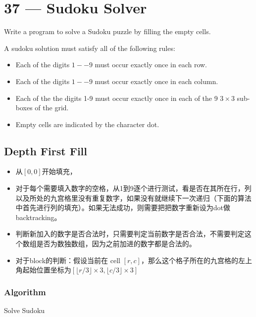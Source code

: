 \section{37 --- Sudoku Solver}
Write a program to solve a Sudoku puzzle by filling the empty cells.

A sudoku solution must satisfy all of the following rules:

\begin{itemize}
\item Each of the digits $1--9$ must occur exactly once in each row.
\item Each of the digits $1--9$ must occur exactly once in each column.
\item Each of the the digits 1-9 must occur exactly once in each of the 9 $3\times 3$ sub-boxes of the grid.
\item Empty cells are indicated by the character dot.
\end{itemize}

\subsection{Depth First Fill}

\begin{itemize}
\item 从$[0,0]$开始填充，
\item 对于每个需要填入数字的空格，从1到9逐个进行测试，看是否在其所在行，列以及所处的九宫格里没有重复数字，如果没有就继续下一次递归（下面的算法中首先进行列的填充）。如果无法成功，则需要把把数字重新设为dot做backtracking。
\item 判断新加入的数字是否合法时，只需要判定当前数字是否合法，不需要判定这个数组是否为数独数组，因为之前加进的数字都是合法的。
\item 对于block的判断：假设当前在 cell $[r,c]$，那么这个格子所在的九宫格的左上角起始位置坐标为$[\lfloor r/3\rfloor\times 3, \lfloor c/3\rfloor\times 3]$
\end{itemize}
\subsubsection{Algorithm}
\setcounter{algorithm}{0}
\begin{algorithm}[H]
\caption{Solve Sudoku}
\begin{algorithmic}[1]
\State {}
\EndProcedure
\end{algorithmic}
\end{algorithm}

